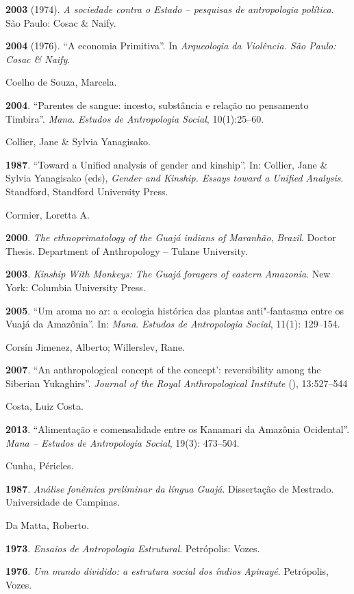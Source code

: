 \begin{Parskip}
\textbf{2003} (1974). \emph{A sociedade contra o Estado -- pesquisas de
antropologia política}. São Paulo: Cosac \& Naify.

\textbf{2004} (1976). ``A economia Primitiva''. In \emph{Arqueologia da
Violência. São Paulo: Cosac \& Naify}.

Coelho de Souza, Marcela.

\textbf{2004}. ``Parentes de sangue: incesto, substância e relação no
pensamento Timbira''. \emph{Mana}. \emph{Estudos de Antropologia
Social}, 10(1):25--60.

Collier, Jane \& Sylvia Yanagisako.

\textbf{1987}. ``Toward a Unified analysis of gender and kinship''. In:
Collier, Jane \& Sylvia Yanagisako (eds), \emph{Gender and Kinship.
Essays toward a Unified Analysis}. Standford, Standford University
Press.

Cormier, Loretta A.

\textbf{2000}. \emph{The ethnoprimatology of the Guajá indians of
Maranhão}, \emph{Brazil}. Doctor Thesis. Department of Anthropology --
Tulane University.

\textbf{2003}. \emph{Kinship With Monkeys: The Guajá foragers of eastern
Amazonia}. New York: Columbia University Press.

\textbf{2005}. ``Um aroma no ar: a ecologia histórica das plantas
anti"-fantasma entre os Vuajá da Amazônia''. In: \emph{Mana}.
\emph{Estudos de Antropologia Social}, 11(1): 129--154.

Corsín Jimenez, Alberto; Willerslev, Rane.

\textbf{2007}. ``An anthropological concept of the concept':
reversibility among the Siberian Yukaghirs''. \emph{Journal of the Royal
Anthropological Institute} (), 13:527--544

Costa, Luiz Costa.

\textbf{2013}. ``Alimentação e comensalidade entre os Kanamari da
Amazônia Ocidental''. \emph{Mana -- Estudos de Antropologia Social},
19(3): 473--504.

Cunha, Péricles.

\textbf{1987}. \emph{Análise fonêmica preliminar da língua Guajá}.
Dissertação de Mestrado. Universidade de Campinas.

Da Matta, Roberto.

\textbf{1973}. \emph{Ensaios de Antropologia Estrutural}. Petrópolis:
Vozes.

\textbf{1976}. \emph{Um mundo dividido: a estrutura social dos índios
Apinayé}. Petrópolis, Vozes.


\end{Parskip}
